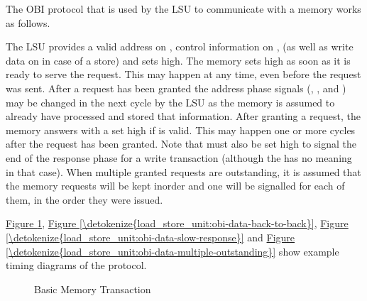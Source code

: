 \documentclass[letterpaper,10pt,english]{sphinxmanual}
\begin{document}
\sphinxAtStartPar
The OBI protocol that is used by the LSU to communicate with a memory works
as follows.

\sphinxAtStartPar
The LSU provides a valid address on , control information
on ,  (as well as write data on  in
case of a store) and sets  high. The memory sets 
high as soon as it is ready to serve the request. This may happen at any
time, even before the request was sent. After a request has been granted
the address phase signals (, ,  and
) may be changed in the next cycle by the LSU as the memory
is assumed to already have processed and stored that information. After
granting a request, the memory answers with a  set high
if  is valid. This may happen one or more cycles after the
request has been granted. Note that  must also be set high
to signal the end of the response phase for a write transaction (although
the  has no meaning in that case). When multiple granted requests
are outstanding, it is assumed that the memory requests will be kept in\sphinxhyphen{}order and
one  will be signalled for each of them, in the order they were issued.

\sphinxAtStartPar
\hyperref[\detokenize{load_store_unit:obi-data-basic}]{Figure \ref{\detokenize{load_store_unit:obi-data-basic}}}, \hyperref[\detokenize{load_store_unit:obi-data-back-to-back}]{Figure \ref{\detokenize{load_store_unit:obi-data-back-to-back}}}, \hyperref[\detokenize{load_store_unit:obi-data-slow-response}]{Figure \ref{\detokenize{load_store_unit:obi-data-slow-response}}} and
\hyperref[\detokenize{load_store_unit:obi-data-multiple-outstanding}]{Figure \ref{\detokenize{load_store_unit:obi-data-multiple-outstanding}}} show example timing diagrams of the protocol.

\begin{figure}[htbp]
\centering
\capstart

\noindent{}
\caption{Basic Memory Transaction}\label{\detokenize{load_store_unit:obi-data-basic}}\end{figure}
\end{document}
